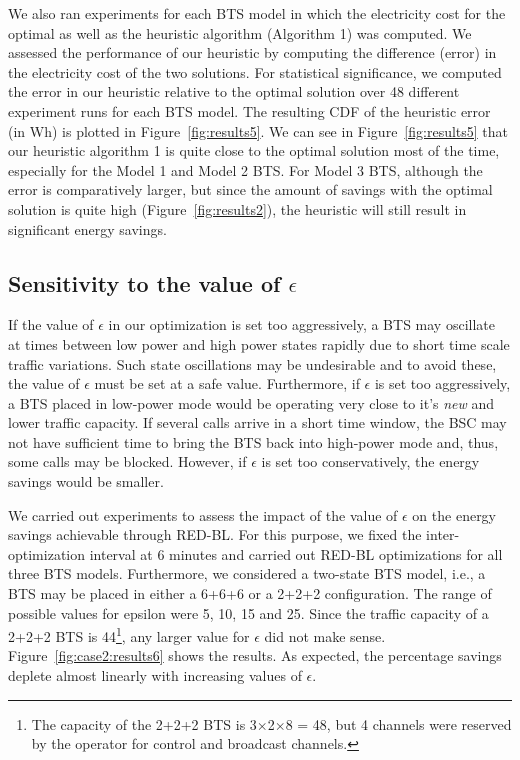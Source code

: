 We also ran experiments for each BTS model in which the electricity cost for the optimal as well as the heuristic algorithm (Algorithm 1) was computed. We assessed the performance of our heuristic by computing the difference (error) in the electricity cost of the two solutions. For statistical significance, we computed the error in our heuristic relative to the optimal solution over 48 different experiment runs for each BTS model. The resulting CDF of the heuristic error (in Wh) is plotted in Figure~\ref{fig:results5}. We can see in Figure~\ref{fig:results5} that our heuristic algorithm 1 is quite close to the optimal solution most of the time, especially for the Model 1 and Model 2 BTS. For Model 3 BTS, although the error is comparatively larger, but since the amount of savings with the optimal solution is quite high (Figure~\ref{fig:results2}), the heuristic will still result in significant energy savings.

\subsection{Sensitivity to the value of $\epsilon$}
\label{subsec:results3}
If the value of $\epsilon$ in our optimization is set too aggressively, a BTS may oscillate at times between low power and high power states rapidly due to short time scale traffic variations. Such state oscillations may be undesirable and to avoid these, the value of $\epsilon$ must be set at a safe value. Furthermore, if $\epsilon$ is set too aggressively, a BTS placed in low-power mode would be operating very close to it's \textit{new} and lower traffic capacity. If several calls arrive in a short time window, the BSC may not have sufficient time to bring the BTS back into high-power mode and, thus, some calls may be blocked. However, if $\epsilon$ is set too conservatively, the energy savings would be smaller.

We carried out experiments to assess the impact of the value of $\epsilon$ on the energy savings achievable through RED-BL. For this purpose, we fixed the inter-optimization interval at 6 minutes and carried out RED-BL optimizations for all three BTS models. Furthermore, we considered a two-state BTS model, i.e., a BTS may be placed in either a 6+6+6 or a 2+2+2 configuration. The range of possible values for epsilon were 5, 10, 15 and 25. Since the traffic capacity of a 2+2+2 BTS is 44\footnote{The capacity of the 2+2+2 BTS is 3$\times$2$\times$8 = 48, but 4 channels were reserved by the operator for control and broadcast channels.}, any larger value for $\epsilon$ did not make sense. Figure~\ref{fig:case2:results6} shows the results. As expected, the percentage savings deplete almost linearly with increasing values of $\epsilon$.

